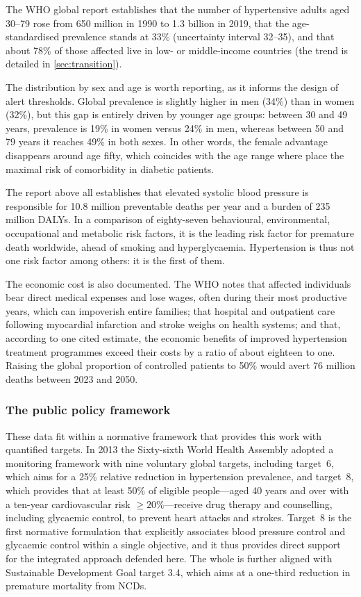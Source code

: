 \documentclass[12pt,a4paper,oneside]{report}
\begin{document}
The WHO global report \parencite{who2023hypertension} establishes that the number of hypertensive adults aged 30--79 rose from 650 million in 1990 to 1.3 billion in 2019, that the age-standardised prevalence stands at 33\% (uncertainty interval 32--35), and that about 78\% of those affected live in low- or middle-income countries (the trend is detailed in \cref{sec:transition}).

The distribution by sex and age is worth reporting, as it informs the design of alert thresholds. Global prevalence is slightly higher in men (34\%) than in women (32\%), but this gap is entirely driven by younger age groups: between 30 and 49 years, prevalence is 19\% in women versus 24\% in men, whereas between 50 and 79 years it reaches 49\% in both sexes. In other words, the female advantage disappears around age fifty, which coincides with the age range where \textcite{hinneh2023} place the maximal risk of comorbidity in diabetic patients.

The report above all establishes that elevated systolic blood pressure is responsible for 10.8 million preventable deaths per year and a burden of 235 million DALYs. In a comparison of eighty-seven behavioural, environmental, occupational and metabolic risk factors, it is the leading risk factor for premature death worldwide, ahead of smoking and hyperglycaemia. Hypertension is thus not one risk factor among others: it is the first of them.

The economic cost is also documented. The WHO notes that affected individuals bear direct medical expenses and lose wages, often during their most productive years, which can impoverish entire families; that hospital and outpatient care following myocardial infarction and stroke weighs on health systems; and that, according to one cited estimate, the economic benefits of improved hypertension treatment programmes exceed their costs by a ratio of about eighteen to one. Raising the global proportion of controlled patients to 50\% would avert 76 million deaths between 2023 and 2050.

\subsubsection{The public policy framework}

These data fit within a normative framework that provides this work with quantified targets. In 2013 the Sixty-sixth World Health Assembly adopted a monitoring framework with nine voluntary global targets, including target~6, which aims for a 25\% relative reduction in hypertension prevalence, and target~8, which provides that at least 50\% of eligible people---aged 40 years and over with a ten-year cardiovascular risk $\geq 20\%$---receive drug therapy and counselling, including glycaemic control, to prevent heart attacks and strokes. Target~8 is the first normative formulation that explicitly associates blood pressure control and glycaemic control within a single objective, and it thus provides direct support for the integrated approach defended here. The whole is further aligned with Sustainable Development Goal target 3.4, which aims at a one-third reduction in premature mortality from NCDs.
\end{document}
